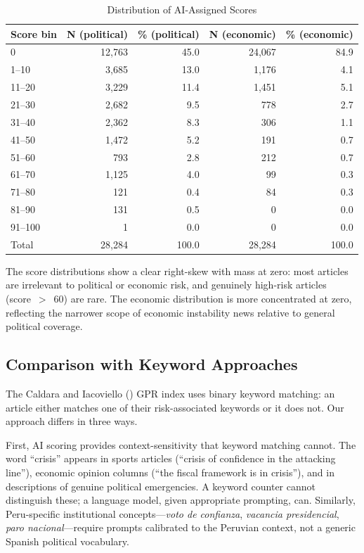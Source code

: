 \documentclass[12pt,a4paper]{article}
\begin{document}
\begin{table}[h!]
\centering
\caption{Distribution of AI-Assigned Scores}
\label{tab:score_dist}
\small
\begin{tabular}{lrrrr}
\toprule
Score bin & N (political) & \% (political) & N (economic) & \% (economic) \\
\midrule
0         & 12,763 & 45.0 & 24,067 & 84.9 \\
1--10     &  3,685 & 13.0 &  1,176 &  4.1 \\
11--20    &  3,229 & 11.4 &  1,451 &  5.1 \\
21--30    &  2,682 &  9.5 &    778 &  2.7 \\
31--40    &  2,362 &  8.3 &    306 &  1.1 \\
41--50    &  1,472 &  5.2 &    191 &  0.7 \\
51--60    &    793 &  2.8 &    212 &  0.7 \\
61--70    &  1,125 &  4.0 &     99 &  0.3 \\
71--80    &    121 &  0.4 &     84 &  0.3 \\
81--90    &    131 &  0.5 &      0 &  0.0 \\
91--100   &      1 &  0.0 &      0 &  0.0 \\
\midrule
Total     & 28,284 & 100.0 & 28,284 & 100.0 \\
\bottomrule
\end{tabular}
\end{table}

The score distributions show a clear right-skew with mass at zero: most
articles are irrelevant to political or economic risk, and genuinely
high-risk articles (score~$>$~60) are rare.  The economic distribution is
more concentrated at zero, reflecting the narrower scope of economic
instability news relative to general political coverage.

\subsection{Comparison with Keyword Approaches}
\label{subsec:keyword_comparison}

The Caldara and Iacoviello (\citeyear{caldara2022}) GPR index uses binary
keyword matching: an article either matches one of their risk-associated
keywords or it does not.  Our approach differs in three ways.

First, AI scoring provides context-sensitivity that keyword matching
cannot.  The word ``crisis'' appears in sports articles (``crisis of
confidence in the attacking line''), economic opinion columns (``the
fiscal framework is in crisis''), and in descriptions of genuine political
emergencies.  A keyword counter cannot distinguish these; a language model,
given appropriate prompting, can.  Similarly, Peru-specific institutional
concepts---\emph{voto de confianza}, \emph{vacancia presidencial},
\emph{paro nacional}---require prompts calibrated to the Peruvian context,
not a generic Spanish political vocabulary.
\end{document}
